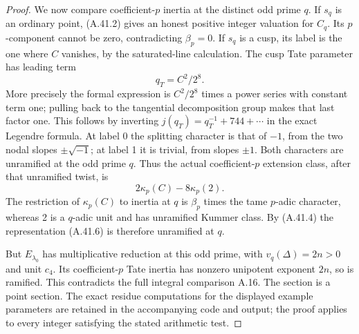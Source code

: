 \begin{proof}
We now compare coefficient-$p$ inertia at the distinct odd prime
$q$.  If $s_q$ is an ordinary point, (A.41.2) gives an honest
positive integer valuation for $C_q$.  Its $p$-component cannot be
zero, contradicting $\beta_p=0$.  If $s_q$ is a cusp, its label is
the one where $C$ vanishes, by the saturated-line calculation.
The cusp Tate parameter has leading term
\[
                       q_T=C^2/2^8.
\tag{A.41.5}
\]
More precisely the formal expression is
$C^2/2^8$ times a power series with constant term one; pulling back
to the tangential decomposition group makes that last factor one.
This follows by inverting $j(q_T)=q_T^{-1}+744+\cdots$ in the exact
Legendre formula.  At label 0 the splitting character is that of
$-1$, from the two nodal slopes $\pm\sqrt{-1}$; at label 1 it is
trivial, from slopes $\pm1$.  Both characters are unramified at
the odd prime $q$.  Thus the actual coefficient-$p$ extension
class, after that unramified twist, is
\[
                    2\kappa_p(C)-8\kappa_p(2).
\tag{A.41.6}
\]
The restriction of $\kappa_p(C)$ to inertia at $q$ is
$\beta_p$ times the tame $p$-adic character, whereas 2 is a
$q$-adic unit and has unramified Kummer class.  By (A.41.4) the
representation (A.41.6) is therefore unramified at $q$.

But $E_{\lambda_0}$ has multiplicative reduction at this odd
prime, with $v_q(\Delta)=2n>0$ and unit $c_4$.  Its coefficient-$p$
Tate inertia has nonzero unipotent exponent $2n$, so is ramified.
This contradicts the full integral comparison A.16.  The section
is a point section.  The exact residue computations for the
displayed example parameters are retained in the accompanying
code and output; the proof applies to every integer satisfying the
stated arithmetic test.
\end{proof}
